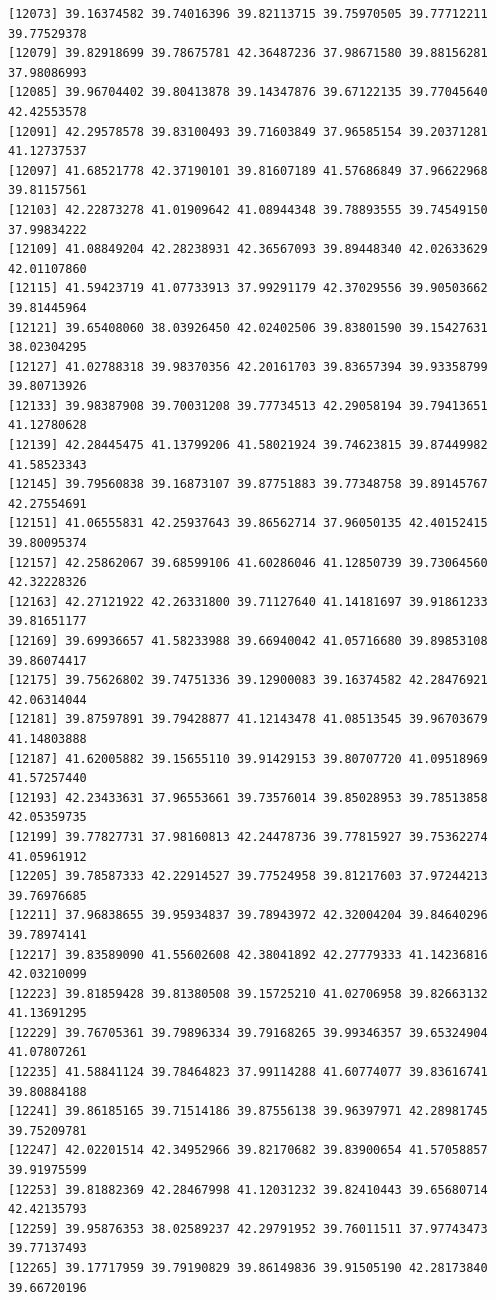 \documentclass[
  letterpaper,
  DIV=11,
  numbers=noendperiod]{scrartcl}
\begin{document}
\begin{verbatim}
[12073] 39.16374582 39.74016396 39.82113715 39.75970505 39.77712211 39.77529378
[12079] 39.82918699 39.78675781 42.36487236 37.98671580 39.88156281 37.98086993
[12085] 39.96704402 39.80413878 39.14347876 39.67122135 39.77045640 42.42553578
[12091] 42.29578578 39.83100493 39.71603849 37.96585154 39.20371281 41.12737537
[12097] 41.68521778 42.37190101 39.81607189 41.57686849 37.96622968 39.81157561
[12103] 42.22873278 41.01909642 41.08944348 39.78893555 39.74549150 37.99834222
[12109] 41.08849204 42.28238931 42.36567093 39.89448340 42.02633629 42.01107860
[12115] 41.59423719 41.07733913 37.99291179 42.37029556 39.90503662 39.81445964
[12121] 39.65408060 38.03926450 42.02402506 39.83801590 39.15427631 38.02304295
[12127] 41.02788318 39.98370356 42.20161703 39.83657394 39.93358799 39.80713926
[12133] 39.98387908 39.70031208 39.77734513 42.29058194 39.79413651 41.12780628
[12139] 42.28445475 41.13799206 41.58021924 39.74623815 39.87449982 41.58523343
[12145] 39.79560838 39.16873107 39.87751883 39.77348758 39.89145767 42.27554691
[12151] 41.06555831 42.25937643 39.86562714 37.96050135 42.40152415 39.80095374
[12157] 42.25862067 39.68599106 41.60286046 41.12850739 39.73064560 42.32228326
[12163] 42.27121922 42.26331800 39.71127640 41.14181697 39.91861233 39.81651177
[12169] 39.69936657 41.58233988 39.66940042 41.05716680 39.89853108 39.86074417
[12175] 39.75626802 39.74751336 39.12900083 39.16374582 42.28476921 42.06314044
[12181] 39.87597891 39.79428877 41.12143478 41.08513545 39.96703679 41.14803888
[12187] 41.62005882 39.15655110 39.91429153 39.80707720 41.09518969 41.57257440
[12193] 42.23433631 37.96553661 39.73576014 39.85028953 39.78513858 42.05359735
[12199] 39.77827731 37.98160813 42.24478736 39.77815927 39.75362274 41.05961912
[12205] 39.78587333 42.22914527 39.77524958 39.81217603 37.97244213 39.76976685
[12211] 37.96838655 39.95934837 39.78943972 42.32004204 39.84640296 39.78974141
[12217] 39.83589090 41.55602608 42.38041892 42.27779333 41.14236816 42.03210099
[12223] 39.81859428 39.81380508 39.15725210 41.02706958 39.82663132 41.13691295
[12229] 39.76705361 39.79896334 39.79168265 39.99346357 39.65324904 41.07807261
[12235] 41.58841124 39.78464823 37.99114288 41.60774077 39.83616741 39.80884188
[12241] 39.86185165 39.71514186 39.87556138 39.96397971 42.28981745 39.75209781
[12247] 42.02201514 42.34952966 39.82170682 39.83900654 41.57058857 39.91975599
[12253] 39.81882369 42.28467998 41.12031232 39.82410443 39.65680714 42.42135793
[12259] 39.95876353 38.02589237 42.29791952 39.76011511 37.97743473 39.77137493
[12265] 39.17717959 39.79190829 39.86149836 39.91505190 42.28173840 39.66720196

\end{verbatim}
\end{document}
